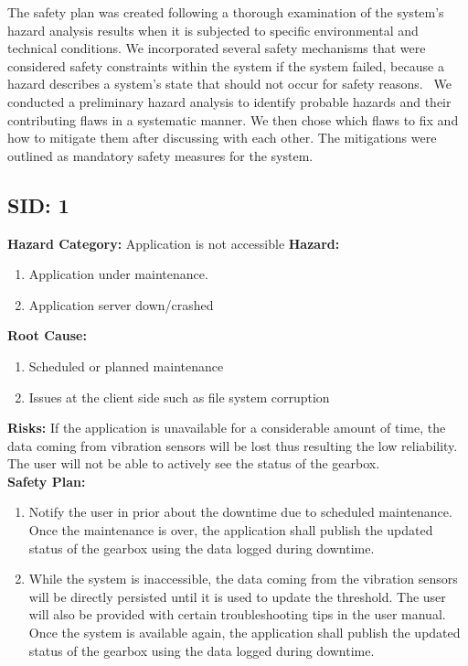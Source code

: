\label{sec:safety}
The safety plan was created following a thorough examination of the system's hazard analysis results when it is subjected to specific environmental and technical conditions. We incorporated several safety mechanisms that were considered safety constraints within the system if the system failed, because a hazard describes a system’s state that should not occur for safety reasons.  We conducted a preliminary hazard analysis to identify probable hazards and their contributing flaws in a systematic manner. We then chose which flaws to fix and how to mitigate them after discussing with each other. The mitigations were outlined as mandatory safety measures for the system.\\

\subsection{SID: 1}		
\textbf{Hazard Category:} Application is not accessible
\textbf{Hazard:}
\begin{enumerate}
	\item Application under maintenance.
	\item Application server down/crashed
\end{enumerate}
\textbf{Root Cause:}
\begin{enumerate}
	\item Scheduled or planned maintenance
	\item Issues at the client side such as file system corruption
\end{enumerate}
\textbf{Risks:} If the application is unavailable for a considerable amount of time, the data coming from vibration sensors will be lost thus resulting the low reliability. The user will not be able to actively see the status of the gearbox.\\
\textbf{Safety Plan:}
\begin{enumerate}
	\item Notify the user in prior about the downtime due to scheduled maintenance. Once the maintenance is over, the application shall publish the updated status of the gearbox using the data logged during downtime.
	\item While the system is inaccessible, the data coming from the vibration sensors will be directly persisted until it is used to update the threshold. The user will also be provided with certain troubleshooting tips in the user manual. Once the system is available again, the application shall publish the updated status of the gearbox using the data logged during downtime.
\end{enumerate}

